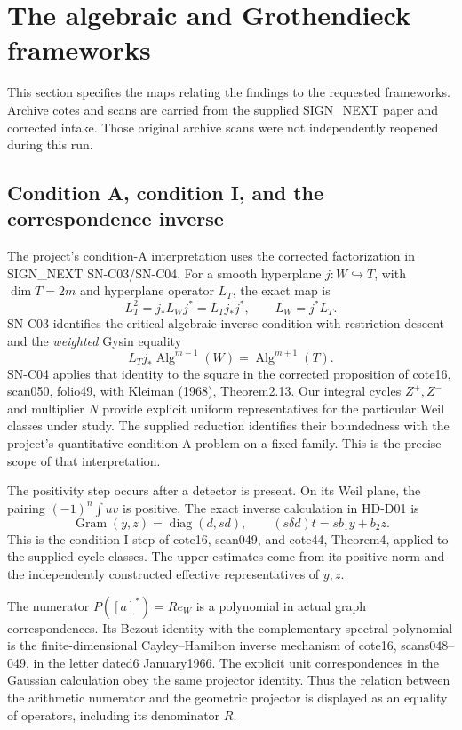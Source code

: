 \section{The algebraic and Grothendieck frameworks}
\label{sec:framework}

This section specifies the maps relating the findings to the requested
frameworks. Archive cotes and scans are carried from the supplied
SIGN\_NEXT paper and corrected intake. Those original archive scans
were not independently reopened during this run.

\subsection{Condition A, condition I, and the correspondence inverse}

The project's condition-A interpretation uses the corrected factorization
in SIGN\_NEXT SN-C03/SN-C04. For a smooth hyperplane
$j:W\hookrightarrow T$, with $\dim T=2m$ and hyperplane operator $L_T$,
the exact map is
\[
 L_T^2=j_*L_Wj^*=L_Tj_*j^*,\qquad L_W=j^*L_T.
\]
SN-C03 identifies the critical algebraic inverse condition with
restriction descent and the \emph{weighted} Gysin equality
\[
 L_Tj_*\operatorname{Alg}^{m-1}(W)
       =\operatorname{Alg}^{m+1}(T).
\]
SN-C04 applies that identity to the square in the corrected proposition
of cote16, scan050, folio49, with Kleiman (1968), Theorem2.13.
Our integral cycles $Z^+,Z^-$ and multiplier $N$ provide explicit
uniform representatives for the particular Weil classes under study.
The supplied reduction identifies their boundedness with the project's
quantitative condition-A problem on a fixed family. This is the precise
scope of that interpretation.

The positivity step occurs after a detector is present. On its Weil
plane, the pairing $(-1)^n\int uv$ is positive. The exact inverse
calculation in HD-D01 is
\[
 \operatorname{Gram}(y,z)=\operatorname{diag}(d,sd),\qquad
 (s\delta d)t=sb_1y+b_2z.
\]
This is the condition-I step of cote16, scan049, and cote44,
Theorem4, applied to the supplied cycle classes. The upper estimates
come from its positive norm and the independently constructed effective
representatives of $y,z$.

The numerator $P([a]^*)=Re_W$ is a polynomial in actual graph
correspondences. Its Bezout identity with the complementary spectral
polynomial is the finite-dimensional Cayley--Hamilton inverse mechanism
of cote16, scans048--049, in the letter dated6 January1966.
The explicit unit correspondences in the Gaussian calculation obey
the same projector identity. Thus the relation between the arithmetic
numerator and the geometric projector is displayed as an equality of
operators, including its denominator $R$.

